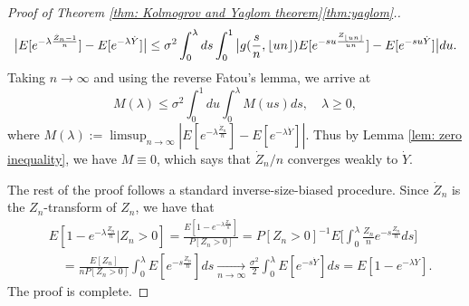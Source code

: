 \documentclass[12pt,a4paper]{amsart}
\DeclarePairedDelimiter\floor{\lfloor}{\rfloor}
\numberwithin{equation}{section}
\begin{document}
\begin{proof}[Proof of Theorem \ref{thm: Kolmogrov and Yaglom theorem}\eqref{thm:yaglom}.]
\begin{comment}
	= n\sigma^2 E[g(\lambda, \floor{Un})e^{-\lambda \dot Z_{\floor{Un}}}].
\end{split}\]
	Integration then yields an expression for the Laplace exponent of $\dot Z_n$,
\[
	- \ln E[ e^{- \lambda \dot Z_n}]
	= \lambda + n \sigma^2 \int_0^\lambda ds \int_0^1 E[g(s, \floor{un}) e^{-s \dot Z_{\floor{un}}}] du,
\]
	which, after a renormalization, says that
\[
	- \ln E[ e^{- \lambda \frac{\dot Z_n}{n}}]
	= \frac{\lambda}{n} + \sigma^2 \int_0^\lambda ds \int_0^1 g(\frac{s}{n}, \floor{un}) E[e^{-su \frac{\dot Z_{\floor{un}}}{un}}] du.
\]
	Let $Y$ be an exponential random variable with mean 
	$a/2=\sigma^2/2$.
	Comparing the above equation with \eqref{eq: lem: our equation: 1}, we have that
\end{comment}
\[
	\big| E[e^{-\lambda \frac{\dot Z_n - 1}{n}}] - E[e^{-\lambda \dot Y}]\big| 
	\leq \sigma^2 \int_0^\lambda ds \int_0^1 \big| g(\frac{s}{n}, \floor{un}) E[e^{-su \frac { Z_{\floor{un}} } {un} }] - E[e^{- su \dot Y}]\big| du.
\]
Taking $n\to \infty$ and using the reverse Fatou's lemma, we arrive at
\[
	M(\lambda)
	\leq \sigma^2 \int_0^1du \int_0^\lambda M(us)ds,
	\quad \lambda\geq 0,
\]
	where 
$M(\lambda) := \limsup_{n\to \infty} | E[ e^{- \lambda \frac{\dot Z_n }{n}}] - E[e^{-\lambda \dot Y}]|$. 
	Thus by Lemma \ref{lem: zero inequality}, we have $M \equiv 0$, which says that $\dot Z_n/n$ converges weakly to $\dot Y$.

	The rest of the proof follows a standard inverse-size-biased procedure. 
	Since $\dot Z_n$ is the $Z_n$-transform of $Z_n$, we have that
	\[\begin{split}
	&E[1-e^{-\lambda \frac{Z_n}{n}} | Z_n > 0] 
	= \frac{E[1- e^{-\lambda \frac{Z_n}{n}}]}{P[Z_n > 0]} 
	= P[Z_n > 0]^{-1} E \Big[\int_0^\lambda \frac{Z_n}{n}e^{- s \frac{Z_n}{n}} ds\Big]
	\\&\quad = \frac{E[Z_n]}{nP[Z_n > 0]}\int_0^\lambda E [e^{- s \frac{\dot Z_n}{n}}] ds
	\xrightarrow[n\to \infty]{} \frac{\sigma^2}{2} \int_0^\lambda E[e^{-s \dot Y}]ds
	= E[1-e^{-\lambda Y}].
	\end{split}\]
	The proof is complete.
\end{proof}
\end{document}
